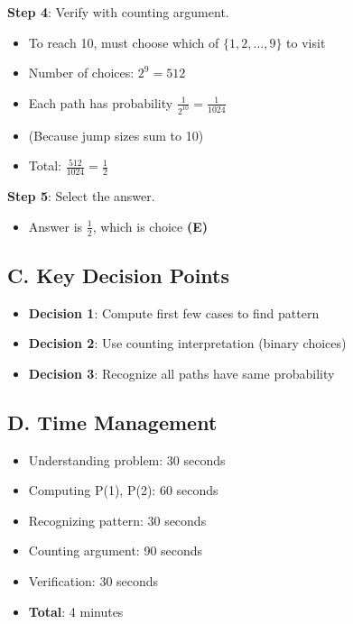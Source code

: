 \documentclass[11pt]{article}
\begin{document}
\begin{roadmapbox}
\textbf{Step 4}: Verify with counting argument.
\begin{itemize}
    \item To reach 10, must choose which of $\{1,2,\ldots,9\}$ to visit
    \item Number of choices: $2^9 = 512$
    \item Each path has probability $\frac{1}{2^{10}} = \frac{1}{1024}$
    \item (Because jump sizes sum to 10)
    \item Total: $\frac{512}{1024} = \frac{1}{2}$
\end{itemize}

\textbf{Step 5}: Select the answer.
\begin{itemize}
    \item Answer is $\frac{1}{2}$, which is choice \textbf{(E)}
\end{itemize}

\subsection*{C. Key Decision Points}
\begin{itemize}[leftmargin=*]
    \item \textbf{Decision 1}: Compute first few cases to find pattern
    \item \textbf{Decision 2}: Use counting interpretation (binary choices)
    \item \textbf{Decision 3}: Recognize all paths have same probability
\end{itemize}

\subsection*{D. Time Management}
\begin{itemize}[leftmargin=*]
    \item Understanding problem: 30 seconds
    \item Computing P(1), P(2): 60 seconds
    \item Recognizing pattern: 30 seconds
    \item Counting argument: 90 seconds
    \item Verification: 30 seconds
    \item \textbf{Total}: 4 minutes
\end{itemize}
\end{roadmapbox}
\end{document}
